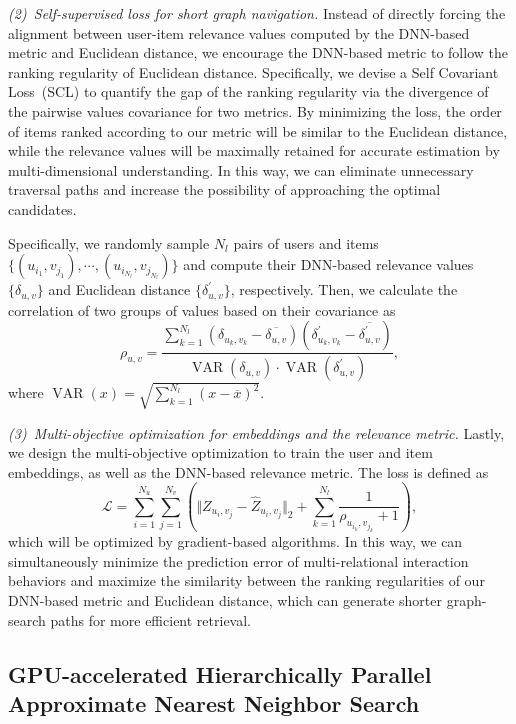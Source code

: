 \textit{(2)~Self-supervised loss for short graph navigation.}
Instead of directly forcing the alignment between user-item relevance values computed by the DNN-based metric and Euclidean distance, we encourage the DNN-based metric to follow the ranking regularity of Euclidean distance.
Specifically, we devise a Self Covariant Loss~(SCL) to quantify the gap of the ranking regularity via the divergence of the pairwise values covariance for two metrics.
By minimizing the loss, the order of items ranked according to our metric will be similar to the Euclidean distance, while the relevance values will be maximally retained for accurate estimation by multi-dimensional understanding.
In this way, we can eliminate unnecessary traversal paths and increase the possibility of approaching the optimal candidates.

Specifically, we randomly sample $N_l$ pairs of users and items $\{(u_{i_1},v_{j_1}),\cdots,(u_{i_{N_l}},v_{j_{N_l}})\}$ and compute their DNN-based relevance values $\{\delta_{u,v}\}$ and Euclidean distance $\{\delta^{\prime}_{u,v}\}$, respectively. Then, we calculate the correlation of two groups of values based on their covariance as
\begin{equation}
    \rho_{u,v} = {\frac {\sum \limits _{k=1}^{N_l}(\delta_{u_k,v_k}-{\overline {\delta_{u,v}}})(\delta^{\prime}_{u_k,v_k}-{\overline {\delta^{\prime}_{u,v}}})}{{\operatorname{VAR}(\delta_{u,v})} \cdot {\operatorname{VAR}(\delta^{\prime}_{u,v})}}},
\end{equation}
where $\operatorname{VAR}(x)=\sqrt {\sum_{k=1}^{N_l}(x-{\overline {x}})^{2}}$.


\textit{(3)~Multi-objective optimization for embeddings and the relevance metric.}
Lastly, we design the multi-objective optimization to train the user and item embeddings, as well as the DNN-based relevance metric. The loss is defined as
\begin{equation}
    \mathcal{L} = \sum\limits_{i=1}^{N_u} \sum\limits_{j=1}^{N_v} (\Vert Z_{u_i,v_j} - \hat{Z}_{u_i,v_j} \Vert_2 + \sum\limits_{k=1}^{N_l} \frac{1}{\rho_{u_{i_k},v_{j_k}}+1}),
\end{equation}
which will be optimized by gradient-based algorithms.
In this way, we can simultaneously minimize the prediction error of multi-relational interaction behaviors and maximize the similarity between the ranking regularities of our DNN-based metric and Euclidean distance, which can generate shorter graph-search paths for more efficient retrieval.


\subsection{GPU-accelerated Hierarchically Parallel Approximate Nearest Neighbor Search}\label{gmpgr:sec:search}

